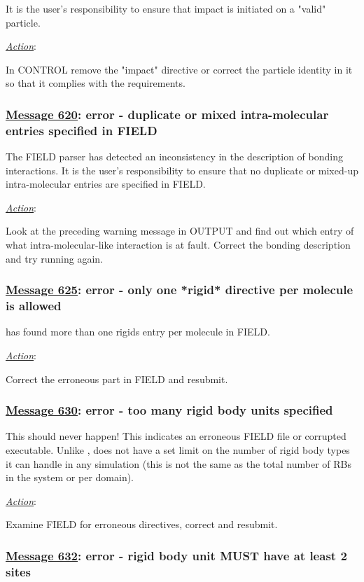 It is the user's responsibility to ensure that impact is
initiated on a "valid" particle.

\noindent \underline{\em Action}:

In CONTROL remove the "impact" directive or correct the particle
identity in it so that it complies with the requirements.

\subsubsection*{\underline{Message 620}: error - duplicate or mixed intra-molecular entries specified in FIELD}

The FIELD parser has detected an inconsistency in the
description of bonding interactions.  It is the user's
responsibility to ensure that no duplicate or mixed-up
intra-molecular entries are specified in FIELD.

\noindent \underline{\em Action}:

Look at the preceding warning message in OUTPUT and find out
which entry of what intra-molecular-like interaction is at
fault.  Correct the bonding description and try running again.

\subsubsection*{\underline{Message 625}: error - only one *rigid* directive per molecule is allowed}

\D has found more than one rigids entry per molecule in FIELD.

\noindent \underline{\em Action}:

Correct the erroneous part in FIELD and resubmit.

\subsubsection*{\underline{Message 630}: error - too many rigid body units specified}

This should never happen!  This indicates an erroneous FIELD file
or corrupted \D executable.  Unlike \C, \D does not have a
set limit on the number of rigid body types it can handle in any
simulation (this is not the same as the total number of RBs in the
system or per domain).

\noindent \underline{\em Action}:

Examine FIELD for erroneous directives, correct and resubmit.

\subsubsection*{\underline{Message 632}: error - rigid body unit MUST have at least 2 sites}

